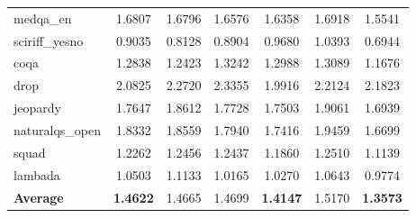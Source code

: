 \begin{table}[t]
\begin{tabular}{l cc cc cc}
        medqa\_en & 1.6807 & {1.6796} & 1.6576 & {1.6358} & 1.6918 & {1.5541} \\
        sciriff\_yesno & 0.9035 & {0.8128} & 0.8904 & {0.9680} & 1.0393 & {0.6944} \\
        \midrule
        coqa & 1.2838 & {1.2423} & 1.3242 & {1.2988} & 1.3089 & {1.1676} \\
        drop & {2.0825} & 2.2720 & 2.3355 & {1.9916} & 2.2124 & {2.1823} \\
        jeopardy & {1.7647} & 1.8612 & 1.7728 & {1.7503} & 1.9061 & {1.6939} \\
        naturalqs\_open & {1.8332} & 1.8559 & 1.7940 & {1.7416} & 1.9459 & {1.6699} \\
        squad & {1.2262} & 1.2456 & 1.2437 & {1.1860} & 1.2510 & {1.1139} \\
        \midrule
        lambada & {1.0503} & 1.1133 & 1.0165 & {1.0270} & 1.0643 & {0.9774} \\
        \midrule
        \textbf{Average} & \textbf{1.4622} & 1.4665 & 1.4699 & \textbf{1.4147} & 1.5170 & \textbf{1.3573} \\
        \bottomrule
    \end{tabular}
\end{table}

